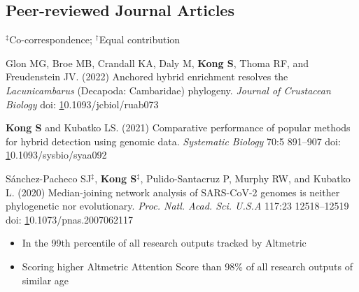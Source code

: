 \documentclass[11pt]{article}
\begin{document}
\pagebreak

\subsection*{Peer-reviewed Journal Articles}
$^\ddag$Co-correspondence; $^\dag$Equal contribution
\begin{etaremune}

\item Glon MG, Broe MB, Crandall KA, Daly M, \textbf{Kong S}, Thoma RF, and Freudenstein JV. (2022) Anchored hybrid enrichment resolves the \textit{Lacunicambarus} (Decapoda: Cambaridae) phylogeny. \textit{Journal of Crustacean Biology} doi: \href{https://doi.org/10.1093/jcbiol/ruab073}10.1093/jcbiol/ruab073

\item \textbf{Kong S} and Kubatko LS. (2021) Comparative performance of popular methods for hybrid detection using genomic data. \textit {Systematic Biology} 70:5 891–907 doi: \href{10.1093/sysbio/syaa092}10.1093/sysbio/syaa092

\item  Sánchez-Pacheco SJ{$^\ddag$}, \textbf{Kong S}{$^\ddag$}, Pulido-Santacruz P, Murphy RW, and Kubatko L. (2020) Median-joining network analysis of SARS-CoV-2 genomes is neither phylogenetic nor evolutionary. \textit{Proc. Natl. Acad. Sci. U.S.A} 117:23 12518–12519 doi: \href{https://doi.org/10.1073/pnas.2007062117}10.1073/pnas.2007062117
	
	\begin{itemize}\item In the 99th percentile of all research outputs tracked by Altmetric
				\item Scoring higher Altmetric Attention Score than 98\% of all research outputs of similar age \end{itemize}
	

\end{etaremune}
\end{document}
